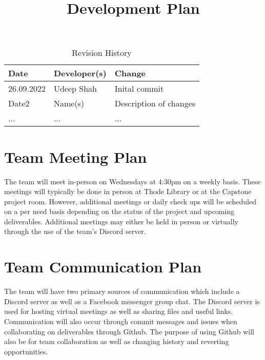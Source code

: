 \documentclass{article}
\title{Development Plan\\\progname}
\author{\authname}
\date{}
\begin{document}
\begin{table}[hp]
\caption{Revision History} \label{TblRevisionHistory}
\begin{tabularx}{\textwidth}{llX}
\toprule
\textbf{Date} & \textbf{Developer(s)} & \textbf{Change}\\
\midrule
26.09.2022 & Udeep Shah & Inital commit\\
Date2 & Name(s) & Description of changes\\
... & ... & ...\\
\bottomrule
\end{tabularx}
\end{table}

\newpage

\maketitle

\section{Team Meeting Plan}
The team will meet in-person on Wednesdays at 4:30pm on a weekly basis. These meetings will typically be done in person at Thode Library or at the Capstone project room. However, additional meetings or daily check ups will be scheduled on a per need basis depending on the status of the project and upcoming deliverables. Additional meetings may either be held in person or virtually through the use of the team’s Discord server.

\section{Team Communication Plan}
The team will have two primary sources of communication which include a Discord server as well as a Facebook messenger group chat. The Discord server is used for hosting virtual meetings as well as sharing files and useful links. Communication will also occur through commit messages and issues when collaborating on deliverables through Github. The purpose of using Github will also be for team collaboration as well as changing history and reverting opportunities. 
\end{document}
